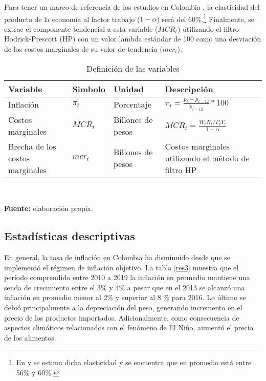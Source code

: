 Para tener un marco de referencia de los estudios en Colombia \citep{galvis2010estimacion,bejarano2005estimacion,hernandez2020evidencia}, la elasticidad del producto de la economía al factor trabajo ($1-\alpha$) será del 60\%.\footnote{En \cite{urrutia2002crecimiento} y \cite{tribin2006tasa}  se estima dicha elasticidad y se encuentra que en promedio está entre 56\% y 60\%.} Finalmente, se extrae el componente tendencial a esta variable ($MCR_{t}$) utilizando el filtro Hodrick-Prescott (HP) con un valor lambda estándar de 100 como una desviación de los costos marginales de su valor de tendencia ($mcr_{t}$).

\begin{table}[H]
  \centering
  \caption{ Definición de las variables}
   \resizebox{15cm}{!} {
  \begin{tabular}{ p{4cm} p{1.2cm} p{4cm} p{5cm}}
  \hline
    Variable & Simbolo & Unidad & Descripción \\
    \hline
    \hline
    Inflación  &    $	\pi_{t}$   & Porcentaje & $\pi_{t}=\frac{p_{t}-p_{t-12}}{p_{t-12}}*100$  \\
    Costos marginales &  $MCR_{t}$     & Billones de pesos & $MCR_{t}=\frac{W_{t}N_{t}/P_{t}Y_{t}}{1-\alpha}$   \\
    Brecha de los costos marginales &   $mcr_{t}$    & Billones de pesos & Costos marginales  utilizando el método de filtro HP \\ 
    \hline
    \end{tabular}%
    }
  \label{tab:addlabel}\\
  \raggedright  \scriptsize \textbf{Fuente:} elaboración propia.
\end{table}%


\subsection{Estadísticas descriptivas}
En general, la tasa de inflación en Colombia ha disminuido desde que se implementó el régimen de inflación objetivo. La tabla \ref{res3} muestra que el período comprendido entre  2010 a 2019 la inflación en promedio mantiene una senda de crecimiento entre el  3\% y 4\% a pesar que en el 2013 se alcanzó una inflación en promedio menor al 2\% y superior al 8 \% para 2016. Lo último se debió principalmente a la depreciación del peso, generando incremento en el precio de los productos importados. Adicionalmente, como consecuencia de aspectos climáticos relacionados con el fenómeno de El Niño, aumentó el precio de los alimentos.\\

